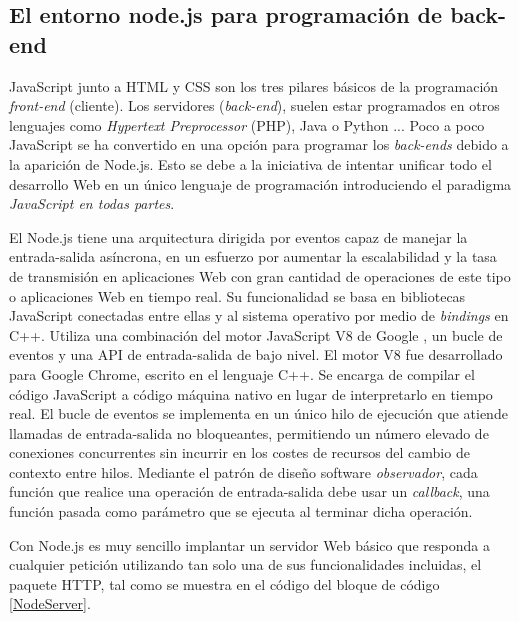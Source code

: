 \subsection{El entorno node.js para programación de back-end}

JavaScript junto a HTML y CSS son los tres pilares básicos de la programación \emph{front-end} (cliente). Los servidores (\emph{back-end}), suelen estar programados en otros lenguajes como \emph{Hypertext Preprocessor} (PHP), Java \cite{JavaServer} o Python \cite{Python}... Poco a poco JavaScript se ha convertido en una opción para programar los \emph{back-ends} debido a la aparición de Node.js.  Esto se debe a la iniciativa de intentar unificar todo el desarrollo Web en un único lenguaje de programación introduciendo el  paradigma \emph{JavaScript en todas partes}.

El Node.js tiene una arquitectura dirigida por eventos capaz de manejar la entrada-salida asíncrona, en un esfuerzo por aumentar la escalabilidad y la tasa de transmisión en aplicaciones Web con gran cantidad de operaciones de este tipo o aplicaciones Web en tiempo real. Su funcionalidad se basa en bibliotecas JavaScript conectadas entre ellas y al sistema operativo por medio de \emph{bindings} en C++. Utiliza una combinación del motor JavaScript V8 de Google \cite{V8}, un bucle de eventos y una API de entrada-salida de bajo nivel. El motor V8 fue desarrollado para Google Chrome, escrito en el lenguaje C++. Se encarga de compilar el código JavaScript a código máquina nativo en lugar de interpretarlo en tiempo real. El bucle de eventos se implementa en un único hilo de ejecución que atiende llamadas de entrada-salida no bloqueantes, permitiendo un número elevado de conexiones concurrentes sin incurrir en los costes de recursos del cambio de contexto entre hilos. Mediante el patrón de diseño software \emph{observador}, cada función que realice una operación de entrada-salida debe usar un \emph{callback}, una función pasada como parámetro que se ejecuta al terminar dicha operación.

Con Node.js es muy sencillo implantar un servidor Web básico que responda a cualquier petición utilizando tan solo una de sus funcionalidades incluidas, el paquete HTTP, tal como se muestra en el código del bloque de código \ref{NodeServer}.


